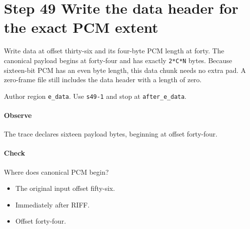 \section{Step 49 Write the data header for the exact PCM extent}\label{pcm-wav-s49}
Write data at offset thirty-six and its four-byte PCM length at forty. The canonical payload begins at forty-four and has exactly \texttt{2*C*N} bytes. Because sixteen-bit PCM has an even byte length, this data chunk needs no extra pad. A zero-frame file still includes the data header with a length of zero.

Author region \texttt{e\_data}. Use \texttt{s49-1} and stop at \texttt{after\_e\_data}.

\paragraph{Observe} The trace declares sixteen payload bytes, beginning at offset forty-four.

\paragraph{Check} Where does canonical PCM begin?
\begin{itemize}
\item[A.] The original input offset fifty-six.
\item[B.] Immediately after RIFF.
\item[C.] Offset forty-four.
\end{itemize}
